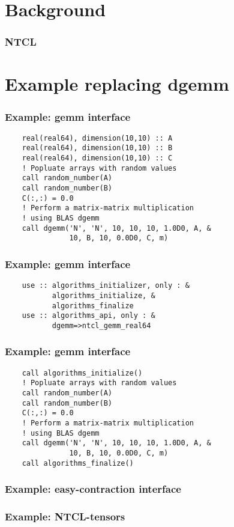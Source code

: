\section{Background}
\begin{frame}
	\frametitle{NTCL}
\end{frame}
\section{Example replacing dgemm}
\begin{frame}[fragile]
	\frametitle{Example: gemm interface}
	\begin{lstlisting}
    real(real64), dimension(10,10) :: A
    real(real64), dimension(10,10) :: B
    real(real64), dimension(10,10) :: C
    ! Popluate arrays with random values
    call random_number(A)
    call random_number(B)
    C(:,:) = 0.0
    ! Perform a matrix-matrix multiplication 
    ! using BLAS dgemm
    call dgemm('N', 'N', 10, 10, 10, 1.0D0, A, &
               10, B, 10, 0.0D0, C, m)
	\end{lstlisting}
\end{frame}

\begin{frame}[fragile]
	\frametitle{Example: gemm interface}
	\begin{lstlisting}
    use :: algorithms_initializer, only : &
           algorithms_initialize, &
           algorithms_finalize
    use :: algorithms_api, only : &
           dgemm=>ntcl_gemm_real64
	\end{lstlisting}
\end{frame}

\begin{frame}[fragile]
	\frametitle{Example: gemm interface}
	\begin{lstlisting}
    call algorithms_initialize()
    ! Popluate arrays with random values
    call random_number(A)
    call random_number(B)
    C(:,:) = 0.0
    ! Perform a matrix-matrix multiplication 
    ! using BLAS dgemm
    call dgemm('N', 'N', 10, 10, 10, 1.0D0, A, &
               10, B, 10, 0.0D0, C, m)
    call algorithms_finalize()
	\end{lstlisting}
\end{frame}

\begin{frame}
	\frametitle{Example: easy-contraction interface}
\end{frame}
\begin{frame}
	\frametitle{Example: NTCL-tensors}
\end{frame}

